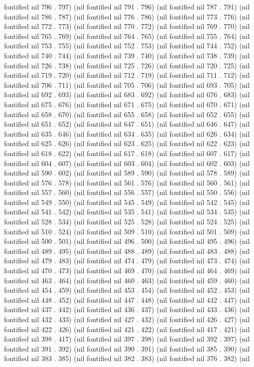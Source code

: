 fontified nil 796 . 797) (nil fontified nil 791 . 796) (nil fontified nil 787 . 791) (nil fontified nil 786 . 787) (nil fontified nil 776 . 786) (nil fontified nil 773 . 776) (nil fontified nil 772 . 773) (nil fontified nil 770 . 772) (nil fontified nil 769 . 770) (nil fontified nil 765 . 769) (nil fontified nil 764 . 765) (nil fontified nil 755 . 764) (nil fontified nil 753 . 755) (nil fontified nil 752 . 753) (nil fontified nil 744 . 752) (nil fontified nil 740 . 744) (nil fontified nil 739 . 740) (nil fontified nil 738 . 739) (nil fontified nil 726 . 738) (nil fontified nil 725 . 726) (nil fontified nil 720 . 725) (nil fontified nil 719 . 720) (nil fontified nil 712 . 719) (nil fontified nil 711 . 712) (nil fontified nil 706 . 711) (nil fontified nil 705 . 706) (nil fontified nil 693 . 705) (nil fontified nil 692 . 693) (nil fontified nil 683 . 692) (nil fontified nil 676 . 683) (nil fontified nil 675 . 676) (nil fontified nil 671 . 675) (nil fontified nil 670 . 671) (nil fontified nil 658 . 670) (nil fontified nil 655 . 658) (nil fontified nil 652 . 655) (nil fontified nil 651 . 652) (nil fontified nil 647 . 651) (nil fontified nil 646 . 647) (nil fontified nil 635 . 646) (nil fontified nil 634 . 635) (nil fontified nil 626 . 634) (nil fontified nil 625 . 626) (nil fontified nil 623 . 625) (nil fontified nil 622 . 623) (nil fontified nil 618 . 622) (nil fontified nil 617 . 618) (nil fontified nil 607 . 617) (nil fontified nil 604 . 607) (nil fontified nil 603 . 604) (nil fontified nil 602 . 603) (nil fontified nil 590 . 602) (nil fontified nil 589 . 590) (nil fontified nil 578 . 589) (nil fontified nil 576 . 578) (nil fontified nil 561 . 576) (nil fontified nil 560 . 561) (nil fontified nil 557 . 560) (nil fontified nil 556 . 557) (nil fontified nil 550 . 556) (nil fontified nil 549 . 550) (nil fontified nil 545 . 549) (nil fontified nil 542 . 545) (nil fontified nil 541 . 542) (nil fontified nil 535 . 541) (nil fontified nil 534 . 535) (nil fontified nil 528 . 534) (nil fontified nil 525 . 528) (nil fontified nil 524 . 525) (nil fontified nil 510 . 524) (nil fontified nil 509 . 510) (nil fontified nil 501 . 509) (nil fontified nil 500 . 501) (nil fontified nil 496 . 500) (nil fontified nil 495 . 496) (nil fontified nil 489 . 495) (nil fontified nil 488 . 489) (nil fontified nil 483 . 488) (nil fontified nil 479 . 483) (nil fontified nil 474 . 479) (nil fontified nil 473 . 474) (nil fontified nil 470 . 473) (nil fontified nil 469 . 470) (nil fontified nil 464 . 469) (nil fontified nil 463 . 464) (nil fontified nil 460 . 463) (nil fontified nil 459 . 460) (nil fontified nil 454 . 459) (nil fontified nil 453 . 454) (nil fontified nil 452 . 453) (nil fontified nil 448 . 452) (nil fontified nil 447 . 448) (nil fontified nil 442 . 447) (nil fontified nil 437 . 442) (nil fontified nil 436 . 437) (nil fontified nil 433 . 436) (nil fontified nil 432 . 433) (nil fontified nil 427 . 432) (nil fontified nil 426 . 427) (nil fontified nil 422 . 426) (nil fontified nil 421 . 422) (nil fontified nil 417 . 421) (nil fontified nil 398 . 417) (nil fontified nil 397 . 398) (nil fontified nil 392 . 397) (nil fontified nil 391 . 392) (nil fontified nil 390 . 391) (nil fontified nil 385 . 390) (nil fontified nil 383 . 385) (nil fontified nil 382 . 383) (nil fontified nil 376 . 382) (nil 